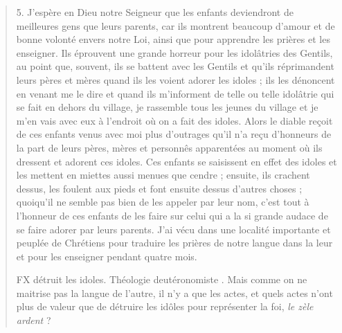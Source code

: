 \begin{quote}
5. J'espère en Dieu notre Seigneur que les enfants deviendront
de meilleures gens que leurs parents, car ils montrent beaucoup
d'amour et de bonne volonté envers notre Loi, ainsi que pour
apprendre les prières et les enseigner. Ils éprouvent une grande horreur
pour les idolâtries des Gentils, au point que, souvent, ils se
battent avec les Gentils et qu'ils réprimandent leurs pères et mères
quand ils les voient adorer les idoles ; ils les dénoncent en venant
me le dire et quand ils m'informent de telle ou telle idolâtrie qui
se fait en dehors du village, je rassemble tous les jeunes du village
et je m'en vais avec eux à l'endroit où on a fait des idoles. Alors
le diable reçoit de ces enfants venus avec moi plus d'outrages qu'il
n'a reçu d'honneurs de la part de leurs pères, mères et personnês
apparentées au moment où ils dressent et adorent ces idoles. Ces
enfants se saisissent en effet des idoles et les mettent en miettes
aussi menues que cendre ; ensuite, ils crachent dessus, les foulent
aux pieds et font ensuite dessus d'autres choses ; quoiqu'il ne semble
pas bien de les appeler par leur nom, c'est tout à l'honneur de
ces enfants de les faire sur celui qui a la si grande audace de se faire
adorer par leurs parents. J'ai vécu dans une localité importante et
peuplée de Chrétiens pour traduire les prières de notre langue dans
la leur et pour les enseigner pendant quatre mois.

\begin{Synthesis}
FX détruit les idoles. Théologie deutéronomiste . Mais comme on ne maitrise pas la langue de l'autre, il n'y a que les actes, et quels actes n'ont plus de valeur que de détruire les idôles pour représenter la foi, \textit{le zèle ardent} ?


\end{Synthesis}
\end{quote}
